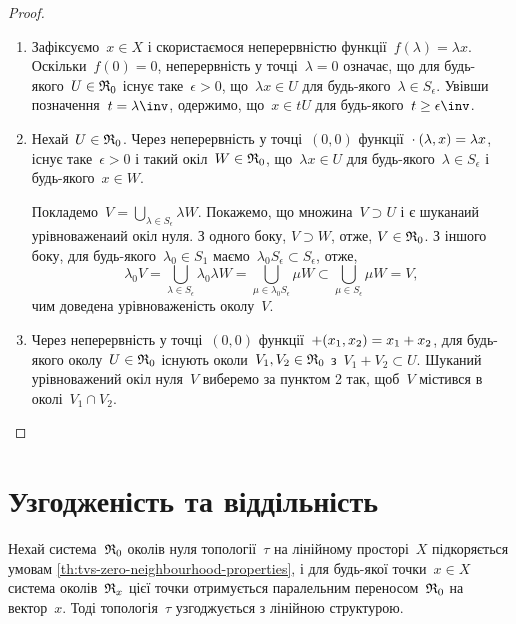 \begin{proof}
    \listhack
    \begin{enumerate}
        \item Зафіксуємо~$x \in X$ і скористаємося неперервністю функції~$f(\lambda) = \lambda x$. Оскільки~$f(0) = 0$, неперервність у точці~$\lambda = 0$ означає, що для будь-якого~$U \in \frak R_0$ існує таке~$\epsilon > 0$, що~$\lambda x \in U$ для будь-якого~$\lambda \in S_\epsilon$. Увівши позначення~$t = \lambda\inv$, одержимо, що~$x \in t U$ для будь-якого~$t \ge \epsilon\inv$.

        \item Нехай~$U \in \frak R_0$. Через неперервність у точці~$(0, 0)$ функції~$\cdot\:(\lambda, x) = \lambda x$, існує таке~$\epsilon > 0$ і такий окіл~$W \in \frak R_0$, що~$\lambda x \in U$ для будь-якого~$\lambda \in S_\epsilon$ і будь-якого~$x \in W$.
        
        Покладемо~$V = \bigcup_{\lambda \in S_\epsilon} \lambda W$. Покажемо, що множина~$V \supset U$ і є шуканаий урівноваженаий окіл нуля. З одного боку, $V \supset W$, отже, $V \in \frak R_0$. З іншого боку, для будь-якого~$\lambda_0 \in S_1$ маємо~$\lambda_0 S_\epsilon \subset S_\epsilon$, отже,
        \begin{equation*}
            \lambda_0 V = \bigcup_{\lambda \in S_\epsilon} \lambda_0 \lambda W = \bigcup_{\mu \in \lambda_0 S_\epsilon} \mu W \subset \bigcup_{\mu \in S_\epsilon} \mu W = V,
        \end{equation*}
        чим доведена урівноваженість околу~$V$.
    
        \item Через неперервність у точці~$(0, 0)$ функції~$+(x_1, x_2) = x_1 + x_2$, для будь-якого околу~$U \in \frak R_0$ існують околи~$V_1, V_2 \in \frak R_0$ з~$V_1 + V_2 \subset U$. Шуканий урівноважений окіл нуля~$V$ виберемо за пунктом 2 так, щоб~$V$ містився в околі~$V_1 \cap V_2$. \qedhere
    \end{enumerate}
\end{proof}

\section{Узгодженість та віддільність}

\begin{theorem}
    Нехай система~$\frak R_0$ околів нуля топології~$\tau$ на лінійному просторі~$X$ підкоряється умовам \cref{th:tvs-zero-neighbourhood-properties}, і для будь-якої точки~$x \in X$ система околів~$\frak R_x$ цієї точки отримується паралельним переносом~$\frak R_0$ на вектор~$x$. Тоді топологія~$\tau$ узгоджується з лінійною структурою.
\end{theorem}

